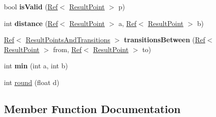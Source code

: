 \begin{DoxyCompactItemize}
\item 
\mbox{\label{classzxing_1_1datamatrix_1_1_detector_aeb390075ffb17f572feee5c45eee58ef}} 
bool {\bfseries is\+Valid} (\mbox{\hyperlink{classzxing_1_1_ref}{Ref}}$<$ \mbox{\hyperlink{classzxing_1_1_result_point}{Result\+Point}} $>$ p)
\item 
\mbox{\label{classzxing_1_1datamatrix_1_1_detector_a89a2f15305d2d78fdebd2719eec70733}} 
int {\bfseries distance} (\mbox{\hyperlink{classzxing_1_1_ref}{Ref}}$<$ \mbox{\hyperlink{classzxing_1_1_result_point}{Result\+Point}} $>$ a, \mbox{\hyperlink{classzxing_1_1_ref}{Ref}}$<$ \mbox{\hyperlink{classzxing_1_1_result_point}{Result\+Point}} $>$ b)
\item 
\mbox{\label{classzxing_1_1datamatrix_1_1_detector_a2213163cf32896905037608f0ad56938}} 
\mbox{\hyperlink{classzxing_1_1_ref}{Ref}}$<$ \mbox{\hyperlink{classzxing_1_1datamatrix_1_1_result_points_and_transitions}{Result\+Points\+And\+Transitions}} $>$ {\bfseries transitions\+Between} (\mbox{\hyperlink{classzxing_1_1_ref}{Ref}}$<$ \mbox{\hyperlink{classzxing_1_1_result_point}{Result\+Point}} $>$ from, \mbox{\hyperlink{classzxing_1_1_ref}{Ref}}$<$ \mbox{\hyperlink{classzxing_1_1_result_point}{Result\+Point}} $>$ to)
\item 
\mbox{\label{classzxing_1_1datamatrix_1_1_detector_a8a2319146c27022e6d15448b678e3f71}} 
int {\bfseries min} (int a, int b)
\item 
int \mbox{\hyperlink{classzxing_1_1datamatrix_1_1_detector_a420331020a84da886b96d1184962bfd7}{round}} (float d)
\end{DoxyCompactItemize}


\subsection{Member Function Documentation}
\mbox{\label{classzxing_1_1datamatrix_1_1_detector_a978bb9582b4d69f75c88b94c57985405}} 
